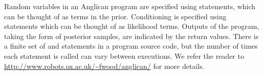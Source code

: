 Random variables in an Anglican program are specified using \sample statements, which can be thought of as terms in the prior. Conditioning is specified using \observe statements which can be thought of as likelihood terms.  Outputs of the program, taking the form of posterior samples, are indicated by the return values.  There is a finite set of \sample and \observe statements in a program source code, but the number of times each statement is called can vary between executions.  We refer the reader to  \href{http://www.robots.ox.ac.uk/~fwood/anglican/}{\small\url{http://www.robots.ox.ac.uk/~fwood/anglican/}} for more details.
%


